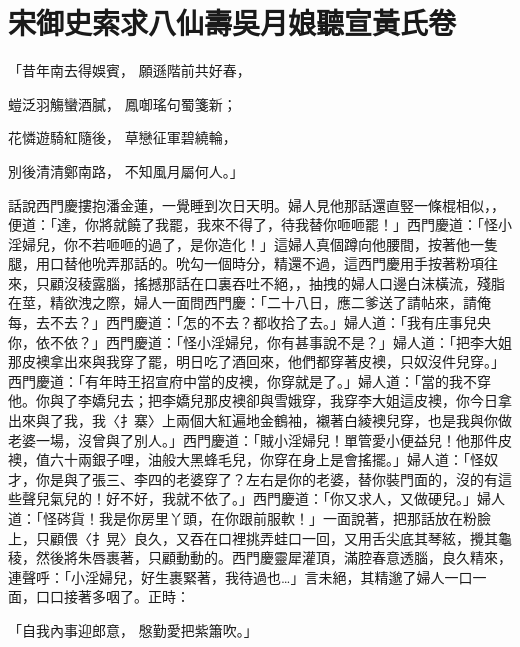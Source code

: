 %

\chapter{宋御史索求八仙壽\KG 吳月娘聽宣黃氏卷}


\begin{showcontents}{}




「昔年南去得娛賓，  願遜階前共好春，

螘泛羽觴蠻酒膩，  鳳啣瑤句蜀箋新；

花憐遊騎紅隨後，  草戀征軍碧繞輪，

別後清清鄭南路，  不知風月屬何人。」

話說西門慶摟抱潘金蓮，一覺睡到次日天明。婦人見他那話還直竪一條棍相似，，便道：「達，你將就饒了我罷，我來不得了，待我替你咂咂罷！」西門慶道：「怪小淫婦兒，你不若咂咂的過了，是你造化！」這婦人真個蹲向他腰間，按著他一隻腿，用口替他吮弄那話的。吮勾一個時分，精還不過，這西門慶用手按著粉項往來，只顧沒稜露腦，搖撼那話在口裏吞吐不絕，，抽拽的婦人口邊白沫橫流，殘脂在莖，精欲洩之際，婦人一面問西門慶：「二十八日，應二爹送了請帖來，請俺每，去不去？」西門慶道：「怎的不去？都收拾了去。」婦人道：「我有庄事兒央你，依不依？」西門慶道：「怪小淫婦兒，你有甚事說不是？」婦人道：「把李大姐那皮襖拿出來與我穿了罷，明日吃了酒回來，他們都穿著皮襖，只奴沒件兒穿。」西門慶道：「有年時王招宣府中當的皮襖，你穿就是了。」婦人道：「當的我不穿他。你與了李嬌兒去；把李嬌兒那皮襖卻與雪娥穿，我穿李大姐這皮襖，你今日拿出來與了我，我〈扌寨〉上兩個大紅遍地金鶴袖，襯著白綾襖兒穿，也是我與你做老婆一場，沒曾與了別人。」西門慶道：「賊小淫婦兒！單管愛小便益兒！他那件皮襖，值六十兩銀子哩，油般大黑蜂毛兒，你穿在身上是會搖擺。」婦人道：「怪奴才，你是與了張三、李四的老婆穿了？左右是你的老婆，替你裝門面的，沒的有這些聲兒氣兒的！好不好，我就不依了。」西門慶道：「你又求人，又做硬兒。」婦人道：「怪硶貨！我是你房里丫頭，在你跟前服軟！」一面說著，把那話放在粉臉上，只顧偎〈扌晃〉良久，又吞在口裡挑弄蛙口一回，又用舌尖底其琴絃，攪其龜稜，然後將朱唇裹著，只顧動動的。西門慶靈犀灌頂，滿腔春意透腦，良久精來，連聲呼：「小淫婦兒，好生裹緊著，我待過也…」言未絕，其精邈了婦人一口一面，口口接著多咽了。正時：

「自我內事迎郎意，  慇勤愛把紫簫吹。」


\end{showcontents}
